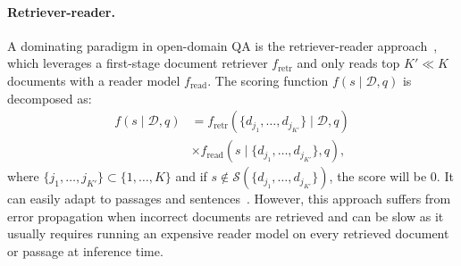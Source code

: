 \documentclass[11pt,a4paper]{article}
\newcommand{\draftonly}[1]{#1}
\newcommand{\draftcomment}[3]{\draftonly{\textcolor{#2}{{{[#1: #3]}}}}}
\newcommand{\jinhyuk}[1]{\draftcomment{Jinhyuk}{blue}{#1}}
\begin{document}
\paragraph{Retriever-reader.}
A dominating paradigm in open-domain QA is the retriever-reader approach~\cite{chen2017reading,lee2019latent,karpukhin2020dense}, which leverages a first-stage document retriever $f_{\text{retr}}$ and only reads top $K' \ll K$ documents with a reader model $f_{\text{read}}$. The scoring function $f(s \mid \mathcal{D}, q) $ is decomposed as:
\vspace{-0.3em}
\begin{equation}
\begin{split}
     f(s \mid \mathcal{D}, q) & =  f_{\text{retr}}(\{d_{j_1}, \ldots, d_{j_{K'}}\} \mid \mathcal{D}, q) \\ & \times f_{\text{read}}(s \mid \{d_{j_1}, \ldots, d_{j_{K'}}\}, q),
\end{split}
\end{equation}
where $\{j_1, \ldots, j_{K'}\} \subset \{1, \ldots, K\}$ and if $s \notin \mathcal{S}(\{d_{j_1}, \ldots, d_{j_{K'}}\})$, the score will be 0.
It can easily adapt to passages and sentences~\cite{yang2019end,wang2019multi}.
However, this approach suffers from error propagation when incorrect documents are retrieved and can be slow as it usually requires running an expensive reader model on every retrieved document or passage at inference time.


\begin{comment}
\paragraph{Reader Only}
A second paradigm, the reader only approach~\citep{roberts2020much} (also known as a closed-book models\jinhyuk{add EaE?} merely depends on parameters of language models ($f_{\text{LM}}$) to store all the factual knowledge:
\begin{equation}
\begin{split}
     f(a \mid \mathcal{D}, q) = f_{\text{LM}}(a \mid q).
\end{split}
\end{equation}
This approach requires gigantic language models (e.g., T5 models with 11G parameters) to achieve competitive performance. It is also known that these models perform more question memorization than generalization~\cite{lewis2020question}.
\end{comment}
\end{document}
